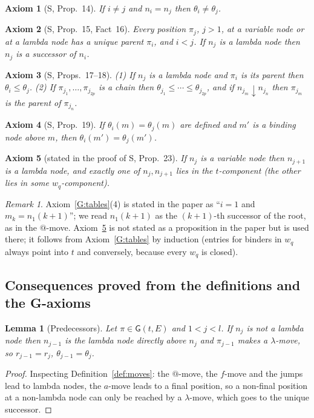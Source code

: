 \documentclass[11pt]{article}
\newcommand{\Gm}{\mathsf{G}}
\newcommand{\bnd}{\mathrel{\downarrow}}
\theoremstyle{plain}
\newtheorem{lemma}[theorem]{Lemma}
\newtheorem{axG}{Axiom}
\theoremstyle{definition}
\theoremstyle{remark}
\newtheorem{remark}[theorem]{Remark}
\begin{document}
\begin{axG}[S, Prop.~14]\label{G:distinct}
If $i\neq j$ and $n_i=n_j$ then $\theta_i\neq\theta_j$.
\end{axG}

\begin{axG}[S, Prop.~15, Fact~16]\label{G:parent}
Every position $\pi_j$, $j>1$, at a variable node or at a lambda node has
a unique parent $\pi_i$, and $i<j$.  If $n_j$ is a lambda node then
$n_j$ is a successor of $n_i$.
\end{axG}

\begin{axG}[S, Props.~17--18]\label{G:mono}
(1) If $n_j$ is a lambda node and $\pi_i$ is its parent then
$\theta_i\le\theta_j$.  (2) If $\pi_{j_1},\dots,\pi_{j_{2p}}$ is a chain
then $\theta_{j_1}\le\cdots\le\theta_{j_{2p}}$, and if $n_{j_m}\bnd n_{j_n}$
then $\pi_{j_m}$ is the parent of $\pi_{j_n}$.
\end{axG}

\begin{axG}[S, Prop.~19]\label{G:agree}
If $\theta_i(m)=\theta_j(m)$ are defined and $m'$ is a binding node above
$m$, then $\theta_i(m')=\theta_j(m')$.
\end{axG}

\begin{axG}[stated in the proof of S, Prop.~23]\label{G:alt}
If $n_j$ is a variable node then $n_{j+1}$ is a lambda node, and exactly
one of $n_j,n_{j+1}$ lies in the $t$-component (the other lies in some
$w_q$-component).
\end{axG}

\begin{remark}
Axiom~\ref{G:tables}(4) is stated in the paper as ``$i=1$ and
$m_k=n_1(k+1)$''; we read $n_1(k+1)$ as the $(k+1)$-th successor of the
root, as in the $@$-move.  Axiom~\ref{G:alt} is not stated as a
proposition in the paper but is used there; it follows from
Axiom~\ref{G:tables} by induction (entries for binders in $w_q$ always
point into $t$ and conversely, because every $w_q$ is closed).
\end{remark}

\subsection{Consequences proved from the definitions and the G-axioms}

\begin{lemma}[Predecessors]\label{lem:pred}
Let $\pi\in\Gm(t,E)$ and $1<j<l$.  If $n_j$ is not a lambda node then
$n_{j-1}$ is the lambda node directly above $n_j$ and $\pi_{j-1}$ makes
a $\lambda$-move, so $r_{j-1}=r_j$, $\theta_{j-1}=\theta_j$.
\end{lemma}
\begin{proof}
Inspecting Definition~\ref{def:moves}: the $@$-move, the $f$-move and
the jumps lead to lambda nodes, the $a$-move leads to a final position,
so a non-final position at a non-lambda node can only be reached by a
$\lambda$-move, which goes to the unique successor.
\end{proof}
\end{document}
